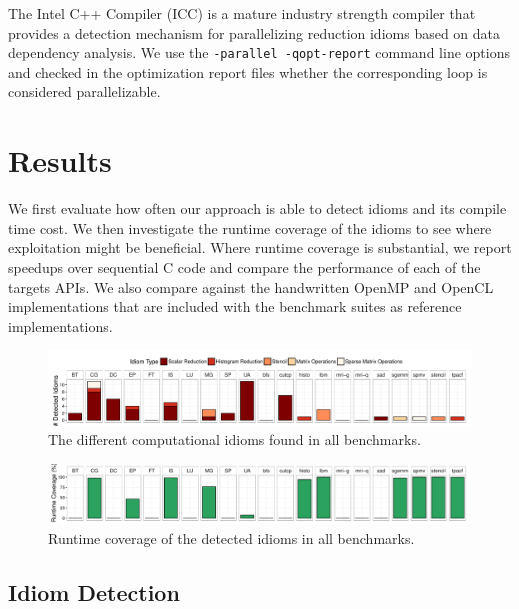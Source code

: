     The Intel C++ Compiler (ICC) is a mature industry strength compiler that
    provides a detection mechanism for parallelizing reduction idioms based on
    data dependency analysis.
    We use the \texttt{-parallel -qopt-report} command line options and checked
    in the optimization report files whether the corresponding loop is
    considered parallelizable.

\section{Results}

    We first evaluate how often our approach is able to detect idioms and its
    compile time cost.
    We then investigate the runtime coverage of the idioms to see where
    exploitation might be beneficial.
    Where runtime coverage is substantial, we report speedups over sequential C
    code and compare the performance of each of the targets APIs.
    We also compare against the handwritten OpenMP and OpenCL implementations
    that are included with the benchmark suites as reference implementations.

\begin{figure}[t]
  \centering
  \includegraphics[width=\textwidth]{figures/asplosplots/detection.pdf}
  \caption{The different computational idioms found in all benchmarks.}
  \label{detection-figure}
\end{figure}
\begin{figure}[t]
  \centering
  \includegraphics[width=\textwidth]{figures/asplosplots/coverage.pdf}
  \caption{Runtime coverage of the detected idioms in all benchmarks.}
  \label{coverage-figure}
  \vspace{0.5em}
\end{figure}

\subsection{Idiom Detection}

